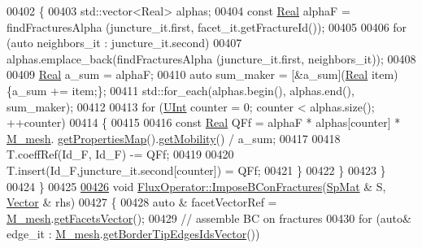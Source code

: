 \begin{DoxyCode}
00402         \{       
00403             std::vector<Real> alphas;
00404             \textcolor{keyword}{const} \hyperlink{namespaceFVCode3D_a40c1f5588a248569d80aa5f867080e83}{Real} alphaF = findFracturesAlpha (juncture\_it.first, facet\_it.getFractureId());
00405 
00406             \textcolor{keywordflow}{for} (\textcolor{keyword}{auto} neighbors\_it : juncture\_it.second)
00407                 alphas.emplace\_back(findFracturesAlpha (juncture\_it.first, neighbors\_it));
00408 
00409             \hyperlink{namespaceFVCode3D_a40c1f5588a248569d80aa5f867080e83}{Real} a\_sum = alphaF;
00410             \textcolor{keyword}{auto} sum\_maker = [&a\_sum](\hyperlink{namespaceFVCode3D_a40c1f5588a248569d80aa5f867080e83}{Real} item)\{a\_sum += item;\};
00411             std::for\_each(alphas.begin(), alphas.end(), sum\_maker);
00412 
00413             \textcolor{keywordflow}{for} (\hyperlink{namespaceFVCode3D_a4bf7e328c75d0fd504050d040ebe9eda}{UInt} counter = 0; counter < alphas.size(); ++counter)
00414             \{
00415                                 
00416                 \textcolor{keyword}{const} \hyperlink{namespaceFVCode3D_a40c1f5588a248569d80aa5f867080e83}{Real} QFf = alphaF * alphas[counter] * \hyperlink{classFVCode3D_1_1global__Operator_a027911d0f801f6f19a3006329ec30a7f}{M\_mesh}.
      \hyperlink{classFVCode3D_1_1Rigid__Mesh_ab6e52fa6193e5db83fe7ccbb1c3737e8}{getPropertiesMap}().\hyperlink{classFVCode3D_1_1PropertiesMap_a810ea62ca881e4db57acd601bcea23cf}{getMobility}() / a\_sum;
00417                 
00418                 T.coeffRef(Id\_F, Id\_F) -= QFf;
00419                 
00420                 T.insert(Id\_F,juncture\_it.second[counter]) = QFf; 
00421                         \}
00422                 \}
00423     \}
00424 \}
00425 
\hypertarget{global__operator_8cpp_source.tex_l00426}{}\hyperlink{classFVCode3D_1_1FluxOperator_aeb808234dae8f8d0a188f8c2efcda0ae}{00426} \textcolor{keywordtype}{void} \hyperlink{classFVCode3D_1_1FluxOperator_aeb808234dae8f8d0a188f8c2efcda0ae}{FluxOperator::ImposeBConFractures}(\hyperlink{namespaceFVCode3D_ac1032289d96638cf0ad6c52ef639095f}{SpMat} & S, 
      \hyperlink{namespaceFVCode3D_a16ccf345652402bccd1a5d2e6782526c}{Vector} & rhs)
00427 \{
00428         \textcolor{keyword}{auto} & facetVectorRef = \hyperlink{classFVCode3D_1_1global__Operator_a027911d0f801f6f19a3006329ec30a7f}{M\_mesh}.\hyperlink{classFVCode3D_1_1Rigid__Mesh_a6d3cdd4ef8a5225599953179d5302636}{getFacetsVector}();
00429         \textcolor{comment}{// assemble BC on fractures}
00430     \textcolor{keywordflow}{for} (\textcolor{keyword}{auto}& edge\_it : \hyperlink{classFVCode3D_1_1global__Operator_a027911d0f801f6f19a3006329ec30a7f}{M\_mesh}.\hyperlink{classFVCode3D_1_1Rigid__Mesh_a12c92b683cfb3d9ac2645f038a8c6220}{getBorderTipEdgesIdsVector}())

\end{DoxyCode}
